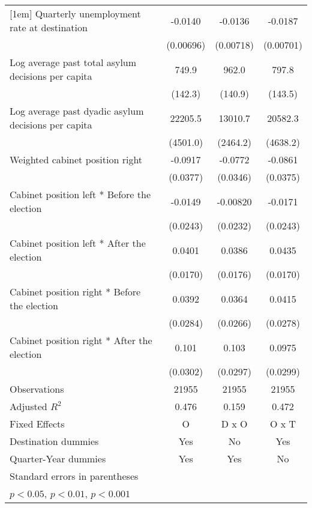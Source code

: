 \begin{table}[htbp]
\begin{tabular}{l*{3}{c}}
[1em]
Quarterly unemployment rate at destination&     -0.0140         &     -0.0136         &     -0.0187\sym{*}  \\
                    &   (0.00696)         &   (0.00718)         &   (0.00701)         \\
[1em]
Log average past total asylum decisions per capita&       749.9\sym{***}&       962.0\sym{***}&       797.8\sym{***}\\
                    &     (142.3)         &     (140.9)         &     (143.5)         \\
[1em]
Log average past dyadic asylum decisions per capita&     22205.5\sym{***}&     13010.7\sym{***}&     20582.3\sym{***}\\
                    &    (4501.0)         &    (2464.2)         &    (4638.2)         \\
[1em]
Weighted cabinet position right&     -0.0917\sym{*}  &     -0.0772\sym{*}  &     -0.0861\sym{*}  \\
                    &    (0.0377)         &    (0.0346)         &    (0.0375)         \\
[1em]
Cabinet position left * Before the election&     -0.0149         &    -0.00820         &     -0.0171         \\
                    &    (0.0243)         &    (0.0232)         &    (0.0243)         \\
[1em]
Cabinet position left * After the election&      0.0401\sym{*}  &      0.0386\sym{*}  &      0.0435\sym{*}  \\
                    &    (0.0170)         &    (0.0176)         &    (0.0170)         \\
[1em]
Cabinet position right * Before the election&      0.0392         &      0.0364         &      0.0415         \\
                    &    (0.0284)         &    (0.0266)         &    (0.0278)         \\
[1em]
Cabinet position right * After the election&       0.101\sym{**} &       0.103\sym{**} &      0.0975\sym{**} \\
                    &    (0.0302)         &    (0.0297)         &    (0.0299)         \\
\hline
Observations        &       21955         &       21955         &       21955         \\
Adjusted \(R^{2}\)  &       0.476         &       0.159         &       0.472         \\
Fixed Effects       &           O         &       D x O         &       O x T         \\
Destination dummies &         Yes         &          No         &         Yes         \\
Quarter-Year dummies&         Yes         &         Yes         &          No         \\
\hline\hline
\multicolumn{4}{l}{\footnotesize Standard errors in parentheses}\\
\multicolumn{4}{l}{\footnotesize \sym{*} \(p<0.05\), \sym{**} \(p<0.01\), \sym{***} \(p<0.001\)}\\
\end{tabular}
\end{table}
